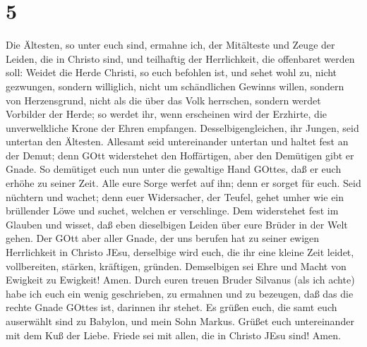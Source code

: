 \hypertarget{section-4}{%
\section{5}\label{section-4}}

 Die Ältesten, so unter euch sind, ermahne ich, der
Mitälteste und Zeuge der Leiden, die in Christo sind, und teilhaftig der
Herrlichkeit, die offenbaret werden soll:  Weidet die Herde
Christi, so euch befohlen ist, und sehet wohl zu, nicht gezwungen,
sondern williglich, nicht um schändlichen Gewinns willen, sondern von
Herzensgrund,  nicht als die über das Volk herrschen,
sondern werdet Vorbilder der Herde;  so werdet ihr, wenn
erscheinen wird der Erzhirte, die unverwelkliche Krone der Ehren
empfangen.  Desselbigengleichen, ihr Jungen, seid untertan
den Ältesten. Allesamt seid untereinander untertan und haltet fest an
der Demut; denn GOtt widerstehet den Hoffärtigen, aber den Demütigen
gibt er Gnade.  So demütiget euch nun unter die gewaltige
Hand GOttes, daß er euch erhöhe zu seiner Zeit.  Alle eure
Sorge werfet auf ihn; denn er sorget für euch.  Seid
nüchtern und wachet; denn euer Widersacher, der Teufel, gehet umher wie
ein brüllender Löwe und suchet, welchen er verschlinge.  Dem
widerstehet fest im Glauben und wisset, daß eben dieselbigen Leiden über
eure Brüder in der Welt gehen.  Der GOtt aber aller Gnade,
der uns berufen hat zu seiner ewigen Herrlichkeit in Christo JEsu,
derselbige wird euch, die ihr eine kleine Zeit leidet, vollbereiten,
stärken, kräftigen, gründen.  Demselbigen sei Ehre und
Macht von Ewigkeit zu Ewigkeit! Amen.  Durch euren treuen
Bruder Silvanus (als ich achte) habe ich euch ein wenig geschrieben, zu
ermahnen und zu bezeugen, daß das die rechte Gnade GOttes ist, darinnen
ihr stehet.  Es grüßen euch, die samt euch auserwählt sind
zu Babylon, und mein Sohn Markus.  Grüßet euch
untereinander mit dem Kuß der Liebe. Friede sei mit allen, die in
Christo JEsu sind! Amen.
